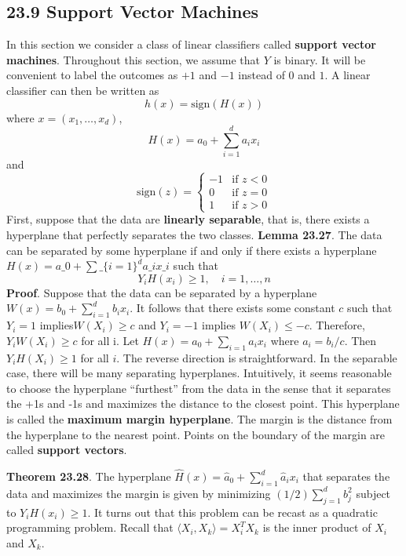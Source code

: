 \subsection*{23.9 Support Vector Machines}\label{support-vector-machines}
In this section we consider a class of linear classifiers called
\textbf{support vector machines}. Throughout this section, we assume
that \(Y\) is binary. It will be convenient to label the outcomes as
\(+1\) and \(-1\) instead of \(0\) and \(1\). A linear classifier can
then be written as
\[
h(x) = \text{sign}( H(x) )
\]
where \(x = (x_{1}, \dots, x_d)\),
\[
H(x) = a_{0} + \sum_{i=1}^{d} a_{i} x_{i}
\]
and
\[
\text{sign}(z) = \begin{cases}
-1 &\text{if } z < 0 \\
0  &\text{if } z = 0 \\
1  &\text{if } z > 0
\end{cases}
\]
First, suppose that the data are \textbf{linearly separable}, that is,
there exists a hyperplane that perfectly separates the two classes.
\textbf{Lemma 23.27}. The data can be separated by some hyperplane if
and only if there exists a hyperplane $H(x) = a\_{0} + \sum\_\{i=1\}^{d}
a\_{i} x\_{i} $ such that
\[
Y_{i} H(x_{i}) \geq 1, \quad i = 1, \dots, n
\]
\textbf{Proof}. Suppose that the data can be separated by a hyperplane
\(W(x) = b_{0} + \sum_{i=1}^{d} b_{i} x_{i}\). It follows that there exists some
constant \(c\) such that \(Y_{i} = 1\) implies\(W(X_{i}) \geq c\) and
\(Y_{i} = -1\) implies \(W(X_{i}) \leq -c\). Therefore,
\(Y_{i} W(X_{i}) \geq c\) for all i. Let \(H(x) = a_{0} + \sum_{i=1} a_{i} x_{i}\)
where \(a_{i} = b_{i} / c\). Then \(Y_{i} H(X_{i}) \geq 1\) for all \(i\). The
reverse direction is straightforward.
In the separable case, there will be many separating hyperplanes.
Intuitively, it seems reasonable to choose the hyperplane ``furthest''
from the data in the sense that it separates the +1s and -1s and
maximizes the distance to the closest point. This hyperplane is called
the \textbf{maximum margin hyperplane}. The margin is the distance from
the hyperplane to the nearest point. Points on the boundary of the
margin are called \textbf{support vectors}.

\textbf{Theorem 23.28}. The hyperplane
\(\hat{H}(x) = \hat{a}_{0} + \sum_{i=1}^{d} \hat{a}_{i} x_{i}\) that separates
the data and maximizes the margin is given by minimizing
\((1/2) \sum_{j=1}^{d} b_{j}^{2}\) subject to \(Y_{i} H(x_{i}) \geq 1\).
It turns out that this problem can be recast as a quadratic programming
problem. Recall that \(\langle X_{i}, X_{k} \rangle = X_{i}^T X_{k}\) is the
inner product of \(X_{i}\) and \(X_{k}\).

